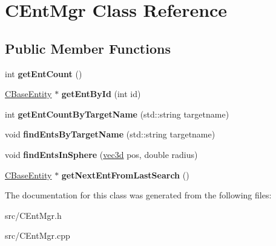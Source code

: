 \hypertarget{class_c_ent_mgr}{
\section{CEntMgr Class Reference}
\label{class_c_ent_mgr}
}
\subsection*{Public Member Functions}
\begin{DoxyCompactItemize}
\item 
\hypertarget{class_c_ent_mgr_a623eb404662b2bcf74d9d4ebe6fd3021}{
int {\bfseries getEntCount} ()}
\label{class_c_ent_mgr_a623eb404662b2bcf74d9d4ebe6fd3021}

\item 
\hypertarget{class_c_ent_mgr_ada1f34090a70b3949e7f1bd9223d55c6}{
\hyperlink{class_c_base_entity}{CBaseEntity} $\ast$ {\bfseries getEntById} (int id)}
\label{class_c_ent_mgr_ada1f34090a70b3949e7f1bd9223d55c6}

\item 
\hypertarget{class_c_ent_mgr_a1b3ad334624feb388cbec543511ab498}{
int {\bfseries getEntCountByTargetName} (std::string targetname)}
\label{class_c_ent_mgr_a1b3ad334624feb388cbec543511ab498}

\item 
\hypertarget{class_c_ent_mgr_a98baf0e2b6889816a5414ae98b429884}{
void {\bfseries findEntsByTargetName} (std::string targetname)}
\label{class_c_ent_mgr_a98baf0e2b6889816a5414ae98b429884}

\item 
\hypertarget{class_c_ent_mgr_ab6a9fa88afc9f47a0207bd67494866d7}{
void {\bfseries findEntsInSphere} (\hyperlink{classvec3d}{vec3d} pos, double radius)}
\label{class_c_ent_mgr_ab6a9fa88afc9f47a0207bd67494866d7}

\item 
\hypertarget{class_c_ent_mgr_a980881fc39db9e17f7d369fc26643e61}{
\hyperlink{class_c_base_entity}{CBaseEntity} $\ast$ {\bfseries getNextEntFromLastSearch} ()}
\label{class_c_ent_mgr_a980881fc39db9e17f7d369fc26643e61}

\end{DoxyCompactItemize}


The documentation for this class was generated from the following files:\begin{DoxyCompactItemize}
\item 
src/CEntMgr.h\item 
src/CEntMgr.cpp\end{DoxyCompactItemize}
